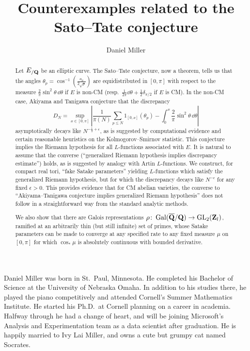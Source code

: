 \documentclass[phd,tocprelim]{cornell}
\title{Counterexamples related to the Sato--Tate conjecture}
\author{Daniel Miller}
\begin{document}
\maketitle
\makecopyright





\begin{abstract}
Let $E_{/\mathbf{Q}}$ be an elliptic curve. The Sato--Tate conjecture, now a theorem, 
tells us that the angles $\theta_p =\cos^{-1}\left(\frac{a_p}{2\sqrt p}\right)$ 
are equidistributed in $[0,\pi]$ with respect to the measure 
$\frac{2}{\pi}\sin^2\theta\, \dd\theta$ if $E$ is non-CM
(resp.~$\frac{1}{2\pi} \dd \theta + \frac 1 2 \delta_{\pi/2}$ if $E$ is CM). 
In the non-CM case, Akiyama and Tanigawa conjecture that the discrepancy 
\[
	D_N = \sup_{x\in [0,\pi]} \left| \frac{1}{\pi(N)} \sum_{p\leqslant N} 1_{[0,x]}(\theta_p) - \int_0^x \frac{2}{\pi}\sin^2\theta\, \dd\theta\right| 
\]
asymptotically decays like $N^{-\frac 1 2+\epsilon}$, as is suggested by computational 
evidence and certain reasonable heuristics on the Kolmogorov--Smirnov 
statistic. This conjecture implies the Riemann hypothesis 
for all $L$-functions associated with $E$. It is natural to assume that the 
converse (``generalized Riemann hypothesis implies discrepancy estimate'') holds, 
as is suggested by analogy with Artin $L$-functions. We construct, for compact 
real tori, ``fake Satake parameters'' yielding $L$-functions which satisfy the 
generalized Riemann hypothesis, but for which the discrepancy decays like 
$N^{-\epsilon}$ for any fixed $\epsilon>0$. This provides evidence that for 
CM abelian varieties, the converse to ``Akiyama--Tanigawa conjecture implies 
generalized Riemann hypothesis'' does not follow in a straightforward way from 
the standard analytic methods. 

We also show that there are Galois representations 
$\rho\colon \operatorname{Gal}(\overline {\mathbf{Q}} /\mathbf{Q}) \to \operatorname{GL}_2(\mathbf{Z}_l)$, ramified at an 
arbitrarily thin (but still infinite) set of primes, whose Satake parameters 
can be made to converge at any specified rate to any fixed measure $\mu$ on 
$[0,\pi]$ for which $\cos_\ast\mu$ is absolutely continuous with bounded 
derivative. 
\end{abstract}





\begin{biosketch}
Daniel Miller was born in St.~Paul, Minnesota. He completed his Bachelor of 
Science at the University of Nebraska Omaha. In addition to his studies there, 
he played the piano competitively and attended Cornell's Summer Mathematics 
Institute. He started his Ph.D.~at Cornell planning on a career in academia. 
Halfway through he had a change of heart, and will be joining Microsoft's 
Analysis and Experimentation team as a data scientist after graduation. He is 
happily married to Ivy Lai Miller, and owns a cute but grumpy cat named Socrates. 
\end{biosketch}
\end{document}
